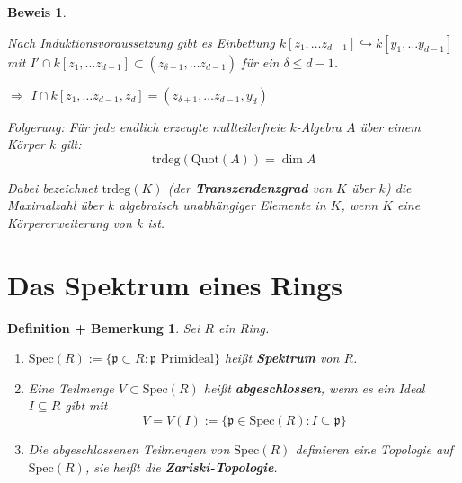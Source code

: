 \documentclass[a4paper,12pt]{scrbook}
\theoremstyle{break}
\newtheorem{DefBem}[Def]{Definition + Bemerkung}
\theoremstyle{nonumberbreak}
\newtheorem{Bew}{Beweis}
\theoremstyle{nonumberplain}
\newcommand{\emp}[1]{\textbf{\emph{#1}}}
\begin{document}
\begin{Bew}
\begin{enumerate}
Nach Induktionsvoraussetzung gibt es Einbettung $k[z_1, \ldots z_{d-1}] \hookrightarrow k[y_1, \ldots y_{d-1}]$ mit $I' \cap k[z_1, \ldots z_{d-1}] \subset (z_{\delta+1}, \ldots z_{d-1})$ für ein $\delta \leq d-1$.

$\Rightarrow$ $I \cap k[z_1, \ldots z_{d-1}, z_d] = (z_{\delta+1}, \ldots z_{d-1}, y_d)$

Folgerung: Für jede endlich erzeugte nullteilerfreie $k$-Algebra $A$ über einem Körper $k$ gilt:
$$\text{trdeg}(\text{Quot}(A)) = \dim A$$

Dabei bezeichnet $\text{trdeg}(K)$ (der \emp{Transzendenzgrad} von $K$ über $k$) die Maximalzahl über $k$ algebraisch unabhängiger Elemente in $K$, wenn $K$ eine Körpererweiterung von $k$ ist.

\end{enumerate}
\end{Bew}
\section{Das Spektrum eines Rings}

\begin{DefBem}
Sei $R$ ein Ring.

\begin{enumerate}
\item[a)] $\textrm{Spec}(R) := \{ \mathfrak{p} \subset R : \mathfrak{p} \text{ Primideal} \}$ heißt \emp{Spektrum} von $R$.

\item[b)] Eine Teilmenge $V \subset \textrm{Spec}(R)$ heißt \emp{abgeschlossen}, wenn es ein Ideal $I \subseteq R$ gibt mit
$$V = V(I) := \{ \mathfrak{p} \in \textrm{Spec}(R) : I \subseteq \mathfrak{p} \}$$

\item[c)] Die abgeschlossenen Teilmengen von $\textrm{Spec}(R)$ definieren eine Topologie auf $\textrm{Spec}(R)$, sie heißt die \emp{Zariski-Topologie}.

\end{enumerate}

\end{DefBem}
\end{document}
